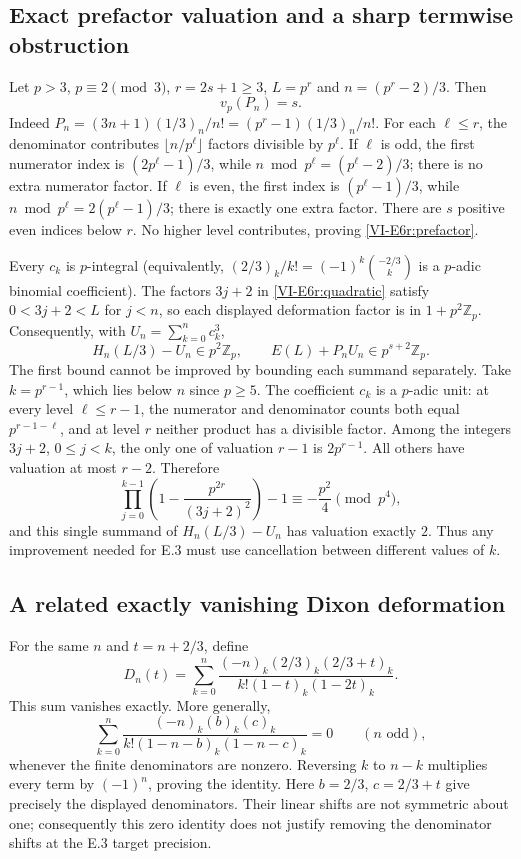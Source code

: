 \documentclass[11pt,letterpaper]{article}
\numberwithin{equation}{section}
\begin{document}
\subsection{Exact prefactor valuation and a sharp termwise obstruction}
Let $p>3$, $p\equiv2\pmod3$, $r=2s+1\ge3$, $L=p^r$ and
$n=(p^r-2)/3$. Then
\begin{equation}\label{VI-E6r:prefactor}
 v_p(P_n)=s.
\end{equation}
Indeed $P_n=(3n+1)(1/3)_n/n!=(p^r-1)(1/3)_n/n!$.
For each $\ell\le r$, the denominator contributes
$\lfloor n/p^\ell\rfloor$ factors divisible by $p^\ell$.
If $\ell$ is odd, the first numerator index is
$(2p^\ell-1)/3$, while $n\bmod p^\ell=(p^\ell-2)/3$;
there is no extra numerator factor. If $\ell$ is even, the first
index is $(p^\ell-1)/3$, while
$n\bmod p^\ell=2(p^\ell-1)/3$; there is exactly one extra factor.
There are $s$ positive even indices below $r$. No higher level
contributes, proving \eqref{VI-E6r:prefactor}.

Every $c_k$ is $p$-integral (equivalently,
$(2/3)_k/k!=(-1)^k\binom{-2/3}{k}$ is a $p$-adic binomial
coefficient). The factors $3j+2$ in \eqref{VI-E6r:quadratic} satisfy
$0<3j+2<L$ for $j<n$, so each displayed deformation factor is
in $1+p^2\mathbb Z_p$. Consequently, with
$U_n=\sum_{k=0}^n c_k^3$,
\begin{equation}\label{VI-E6r:weak-freeze}
 H_n(L/3)-U_n\in p^2\mathbb Z_p,
 \qquad E(L)+P_nU_n\in p^{s+2}\mathbb Z_p.
\end{equation}
The first bound cannot be improved by bounding each summand
separately. Take $k=p^{r-1}$, which lies below $n$ since $p\ge5$.
The coefficient $c_k$ is a $p$-adic unit: at every level
$\ell\le r-1$, the numerator and denominator counts both equal
$p^{r-1-\ell}$, and at level $r$ neither product has a divisible
factor. Among the integers $3j+2$, $0\le j<k$, the only one
of valuation $r-1$ is $2p^{r-1}$. All others have valuation at
most $r-2$. Therefore
\[
 \prod_{j=0}^{k-1}\left(1-\frac{p^{2r}}{(3j+2)^2}\right)-1
 \equiv-\frac{p^2}{4}\pmod{p^4},
\]
and this single summand of $H_n(L/3)-U_n$ has valuation exactly
$2$. Thus any improvement needed for E.3 must use cancellation
between different values of $k$.

\subsection{A related exactly vanishing Dixon deformation}
For the same $n$ and $t=n+2/3$, define
\[
 D_n(t)=\sum_{k=0}^n
 \frac{(-n)_k(2/3)_k(2/3+t)_k}
 {k!(1-t)_k(1-2t)_k}.
\]
This sum vanishes exactly. More generally,
\[
 \sum_{k=0}^n\frac{(-n)_k(b)_k(c)_k}
 {k!(1-n-b)_k(1-n-c)_k}=0\qquad(n\text{ odd}),
\]
whenever the finite denominators are nonzero. Reversing $k$ to
$n-k$ multiplies every term by $(-1)^n$, proving the identity.
Here $b=2/3$, $c=2/3+t$ give precisely the displayed denominators.
Their linear shifts are not symmetric about one; consequently
this zero identity does not justify removing the denominator
shifts at the E.3 target precision.
\end{document}
